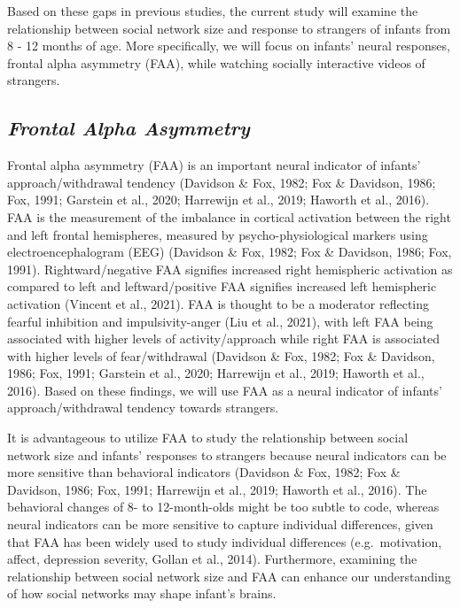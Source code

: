 \documentclass[
  man,
  floatsintext,
  longtable,
  nolmodern,
  notxfonts,
  notimes,
  colorlinks=true,linkcolor=blue,citecolor=blue,urlcolor=blue]{apa7}
\begin{document}
Based on these gaps in previous studies, the current study will examine
the relationship between social network size and response to strangers
of infants from 8 - 12 months of age. More specifically, we will focus
on infants' neural responses, frontal alpha asymmetry (FAA), while
watching socially interactive videos of strangers.

\subsection{\texorpdfstring{\emph{Frontal Alpha
Asymmetry}}{Frontal Alpha Asymmetry}}\label{frontal-alpha-asymmetry}

Frontal alpha asymmetry (FAA) is an important neural indicator of
infants' approach/withdrawal tendency (Davidson \& Fox, 1982; Fox \&
Davidson, 1986; Fox, 1991; Garstein et al., 2020; Harrewijn et al.,
2019; Haworth et al., 2016). FAA is the measurement of the imbalance in
cortical activation between the right and left frontal hemispheres,
measured by psycho-physiological markers using electroencephalogram
(EEG) (Davidson \& Fox, 1982; Fox \& Davidson, 1986; Fox, 1991).
Rightward/negative FAA signifies increased right hemispheric activation
as compared to left and leftward/positive FAA signifies increased left
hemispheric activation (Vincent et al., 2021). FAA is thought to be a
moderator reflecting fearful inhibition and impulsivity-anger (Liu et
al., 2021), with left FAA being associated with higher levels of
activity/approach while right FAA is associated with higher levels of
fear/withdrawal (Davidson \& Fox, 1982; Fox \& Davidson, 1986; Fox,
1991; Garstein et al., 2020; Harrewijn et al., 2019; Haworth et al.,
2016). Based on these findings, we will use FAA as a neural indicator of
infants' approach/withdrawal tendency towards strangers.

It is advantageous to utilize FAA to study the relationship between
social network size and infants' responses to strangers because neural
indicators can be more sensitive than behavioral indicators (Davidson \&
Fox, 1982; Fox \& Davidson, 1986; Fox, 1991; Harrewijn et al., 2019;
Haworth et al., 2016). The behavioral changes of 8- to 12-month-olds
might be too subtle to code, whereas neural indicators can be more
sensitive to capture individual differences, given that FAA has been
widely used to study individual differences (e.g.~motivation, affect,
depression severity, Gollan et al., 2014). Furthermore, examining the
relationship between social network size and FAA can enhance our
understanding of how social networks may shape infant's brains.
\end{document}
